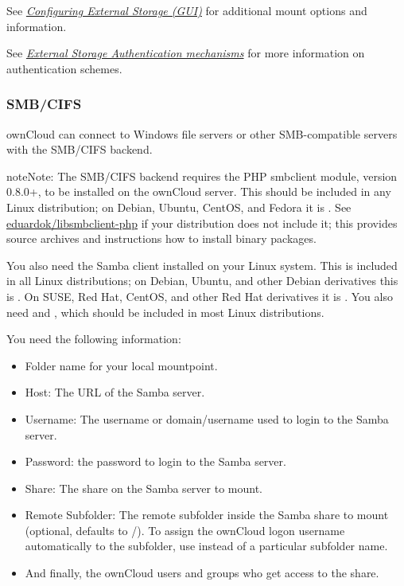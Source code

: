 \documentclass[letterpaper,10pt,english]{sphinxmanual}
\begin{document}
See {\hyperref[configuration_files/external_storage_configuration_gui::doc]{\emph{Configuring External Storage (GUI)}}} for additional mount
options and information.

See {\hyperref[configuration_files/external_storage/auth_mechanisms::doc]{\emph{External Storage Authentication mechanisms}}} for more information on authentication schemes.


\subsubsection{SMB/CIFS}
\label{configuration_files/external_storage/smb::doc}\label{configuration_files/external_storage/smb:smb-cifs}
ownCloud can connect to Windows file servers or other SMB-compatible servers
with the SMB/CIFS backend.

\begin{notice}{note}{Note:}
The SMB/CIFS backend requires the PHP smbclient module, version 0.8.0+, to be installed on the ownCloud server. This should be included in any Linux distribution; on Debian, Ubuntu, CentOS, and Fedora it is . See \href{https://github.com/eduardok/libsmbclient-php}{eduardok/libsmbclient-php} if your distribution does not include it; this provides source archives and instructions how to install binary packages.
\end{notice}

You also need the Samba client installed on your Linux system. This is included in
all Linux distributions; on Debian, Ubuntu, and other Debian derivatives this
is . On SUSE, Red Hat, CentOS, and other Red Hat derivatives it is
. You also need  and , which should be included in most Linux distributions.

You need the following information:
\begin{itemize}
\item {} 
Folder name for your local mountpoint.

\item {} 
Host: The URL of the Samba server.

\item {} 
Username: The username or domain/username used to login to the Samba
server.

\item {} 
Password: the password to login to the Samba server.

\item {} 
Share: The share on the Samba server to mount.

\item {} 
Remote Subfolder: The remote subfolder inside the Samba share to mount
(optional, defaults to /). To assign the ownCloud logon username
automatically to the subfolder, use  instead of a particular
subfolder name.

\item {} 
And finally, the ownCloud users and groups who get access to the share.

\end{itemize}
\end{document}
